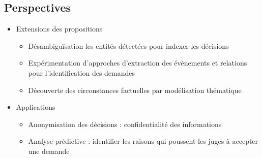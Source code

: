 \subsection{Perspectives}
\begin{frame}[c]{\mysubsectiontitle}

	\begin{itemize} \small
		\item Extensions des propositions 
		\begin{itemize}  \scriptsize
			\item Désambiguïsation les entités détectées pour indexer les décisions
			\item Expérimentation d'approches d'extraction des évènements et relations pour l'identification des demandes		
			\item Découverte des circonstances factuelles par  {modélisation thématique}
		\end{itemize}
		\item Applications
		\begin{itemize}  \scriptsize
			\item {Anonymisation des décisions} : confidentialité des informations
			\item {Analyse prédictive} : identifier les raisons qui poussent les juges à accepter une demande 
		\end{itemize}
	\end{itemize}
\end{frame}